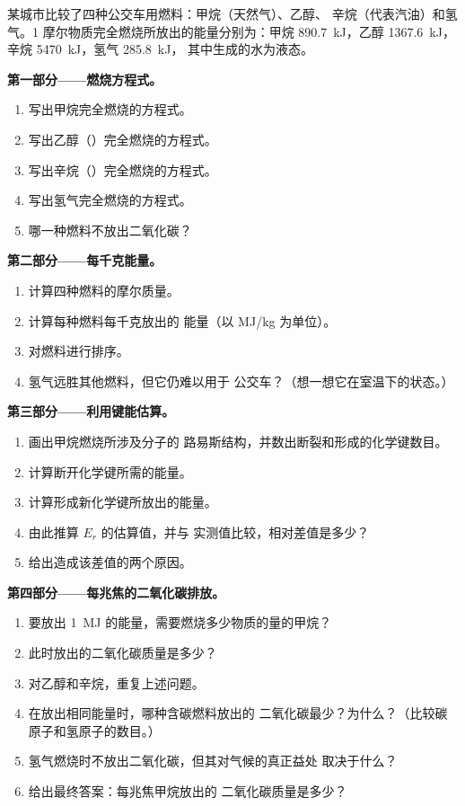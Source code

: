 \begin{problem}
\label{pb:g11:reaction-energy:1}
某城市比较了四种公交车用燃料：甲烷（天然气）、乙醇、
辛烷（代表汽油）和氢气。1 摩尔物质完全燃烧所放出的能量分别为：甲烷
\qty{890.7}{kJ}，乙醇 \qty{1367.6}{kJ}，辛烷
\qty{5470}{kJ}，氢气 \qty{285.8}{kJ}，
其中生成的水为液态。

\medskip
\noindent\textbf{第一部分——燃烧方程式。}
\begin{enumerate}
  \item 写出甲烷完全燃烧的方程式。
  \item 写出乙醇（）完全燃烧的方程式。
  \item 写出辛烷（）完全燃烧的方程式。
  \item 写出氢气完全燃烧的方程式。
  \item 哪一种燃料不放出二氧化碳？
\end{enumerate}

\medskip
\noindent\textbf{第二部分——每千克能量。}
\begin{enumerate}[resume]
  \item 计算四种燃料的摩尔质量。
  \item 计算每种燃料每千克放出的
        能量（以 \si{MJ/kg} 为单位）。
  \item 对燃料进行排序。
  \item 氢气远胜其他燃料，但它仍难以用于
        公交车？（想一想它在室温下的状态。）
\end{enumerate}

\medskip
\noindent\textbf{第三部分——利用键能估算。}
\begin{enumerate}[resume]
  \item 画出甲烷燃烧所涉及分子的
        路易斯结构，并数出断裂和形成的化学键数目。
  \item 计算断开化学键所需的能量。
  \item 计算形成新化学键所放出的能量。
  \item 由此推算 $E_r$ 的估算值，并与
        实测值比较，相对差值是多少？
  \item 给出造成该差值的两个原因。
\end{enumerate}

\medskip
\noindent\textbf{第四部分——每兆焦的二氧化碳排放。}
\begin{enumerate}[resume]
  \item 要放出 \qty{1}{MJ} 的能量，需要燃烧多少物质的量的甲烷？
  \item 此时放出的二氧化碳质量是多少？
  \item 对乙醇和辛烷，重复上述问题。
  \item 在放出相同能量时，哪种含碳燃料放出的
        二氧化碳最少？为什么？（比较碳原子和氢原子的数目。）
  \item 氢气燃烧时不放出二氧化碳，但其对气候的真正益处
        取决于什么？
  \item 给出最终答案：每兆焦甲烷放出的
        二氧化碳质量是多少？
\end{enumerate}
\end{problem}
